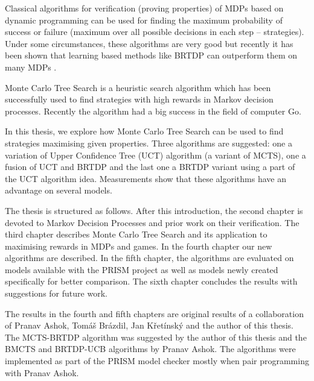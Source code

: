 Classical algorithms for verification (proving properties) of MDPs
based on dynamic programming can be used for finding the
maximum probability of success or failure (maximum over all possible decisions in
each step -- strategies). Under some circumstances, these algorithms are
very good but recently it has been shown that learning based methods
like BRTDP can outperform them on many MDPs \parencite{atva14}.

Monte Carlo Tree Search is a heuristic search algorithm which has been
successfully used to find strategies with high rewards in Markov decision
processes. Recently the algorithm had a big success in the field of
computer Go.

\pagebreak

In this thesis, we explore how Monte Carlo Tree Search can be used to
find strategies maximising given properties. Three algorithms are
suggested: one a variation of Upper Confidence Tree (UCT) algorithm (a variant
of MCTS), one a fusion of UCT and BRTDP and the last one a BRTDP variant
using a part of the UCT algorithm idea.  Measurements show that these
algorithms have an advantage on several models.

The thesis is structured as follows. After this introduction, the second
chapter is devoted to Markov Decision Processes and prior work on their
verification.
The third chapter describes Monte Carlo Tree Search and its application
to maximising rewards in MDPs and games. In the fourth chapter our new
algorithms are described. In the fifth chapter,
the algorithms are evaluated on models available with the PRISM project
as well as models newly created specifically for better comparison.
The sixth chapter concludes the
results with suggestions for future work.

The results in the fourth and fifth chapters are original results of
a collaboration of Pranav Ashok, Tomáš Brázdil, Jan Křetínský and the
author of this thesis. The MCTS-BRTDP algorithm was suggested by the
author of this thesis and the BMCTS and BRTDP-UCB algorithms by Pranav
Ashok. The algorithms were implemented as part of the PRISM model
checker mostly when pair programming with Pranav Ashok.
